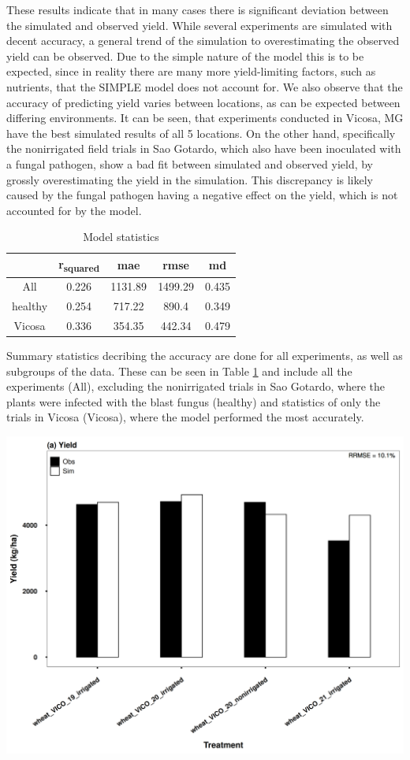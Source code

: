 \documentclass[11pt]{article}
\begin{document}
These results indicate that in many cases there is significant deviation between the simulated and observed yield. While several experiments are simulated with decent accuracy, a general trend of the simulation to overestimating the observed yield can be observed. Due to the simple nature of the model this is to be expected, since in reality there are many more yield-limiting factors, such as nutrients, that the SIMPLE model does not account for.
We also observe that the accuracy of predicting yield varies between locations, as can  be expected between differing environments. It can be seen, that experiments conducted in Vicosa, MG have the best simulated results of all 5 locations. On the other hand, specifically the nonirrigated field trials in Sao Gotardo, which also have been inoculated with a fungal pathogen, show a bad fit between simulated and observed yield, by grossly overestimating the yield in the simulation. This discrepancy is likely caused by the fungal pathogen having a negative effect on the yield, which is not accounted for by the model.

\begin{table}[htbp]
\caption{\label{stats}Model statistics}
\centering
\begin{tabular}{|c|c|c|c|c|}
\hline
 & r\textsubscript{squared} & mae & rmse & md\\
\hline
All & 0.226 & 1131.89 & 1499.29 & 0.435\\
healthy & 0.254 & 717.22 & 890.4 & 0.349\\
Vicosa & 0.336 & 354.35 & 442.34 & 0.479\\
\hline
\end{tabular}
\end{table}

Summary statistics decribing the accuracy are done for all experiments, as well as subgroups of the data. These can be seen in Table \ref{stats} and include all the experiments (All), excluding the nonirrigated trials in Sao Gotardo, where the plants were infected with the blast fungus (healthy) and statistics of only the trials in Vicosa (Vicosa), where the model performed the most accurately.

\begin{center}
\includegraphics[width=.9\linewidth]{../results/experimental-data/2023-02-18_Vico_only.png}
\end{center}
\end{document}
